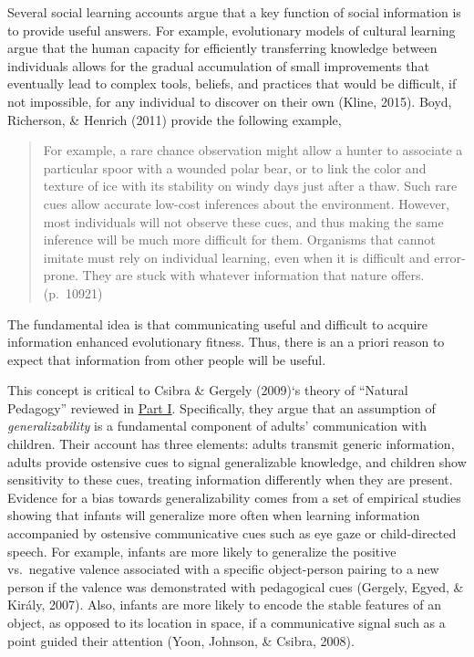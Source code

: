 \documentclass[oneside]{report}
\begin{document}
Several social learning accounts argue that a key function of social
information is to provide useful answers. For example, evolutionary
models of cultural learning argue that the human capacity for
efficiently transferring knowledge between individuals allows for the
gradual accumulation of small improvements that eventually lead to
complex tools, beliefs, and practices that would be difficult, if not
impossible, for any individual to discover on their own (Kline, 2015).
Boyd, Richerson, \& Henrich (2011) provide the following example,
\begin{quote}
For example, a rare chance observation might allow a hunter to associate
a particular spoor with a wounded polar bear, or to link the color and
texture of ice with its stability on windy days just after a thaw. Such
rare cues allow accurate low-cost inferences about the environment.
However, most individuals will not observe these cues, and thus making
the same inference will be much more difficult for them. Organisms that
cannot imitate must rely on individual learning, even when it is
difficult and error-prone. They are stuck with whatever information that
nature offers. (p.~10921)
\end{quote}
\noindent The fundamental idea is that communicating useful and
difficult to acquire information enhanced evolutionary fitness. Thus,
there is an a priori reason to expect that information from other people
will be useful.

This concept is critical to Csibra \& Gergely (2009)`s theory of
``Natural Pedagogy'' reviewed in \protect\hyperlink{p1}{Part I}.
Specifically, they argue that an assumption of \emph{generalizability}
is a fundamental component of adults' communication with children. Their
account has three elements: adults transmit generic information, adults
provide ostensive cues to signal generalizable knowledge, and children
show sensitivity to these cues, treating information differently when
they are present. Evidence for a bias towards generalizability comes
from a set of empirical studies showing that infants will generalize
more often when learning information accompanied by ostensive
communicative cues such as eye gaze or child-directed speech. For
example, infants are more likely to generalize the positive vs.~negative
valence associated with a specific object-person pairing to a new person
if the valence was demonstrated with pedagogical cues (Gergely, Egyed,
\& Király, 2007). Also, infants are more likely to encode the stable
features of an object, as opposed to its location in space, if a
communicative signal such as a point guided their attention (Yoon,
Johnson, \& Csibra, 2008).
\end{document}
